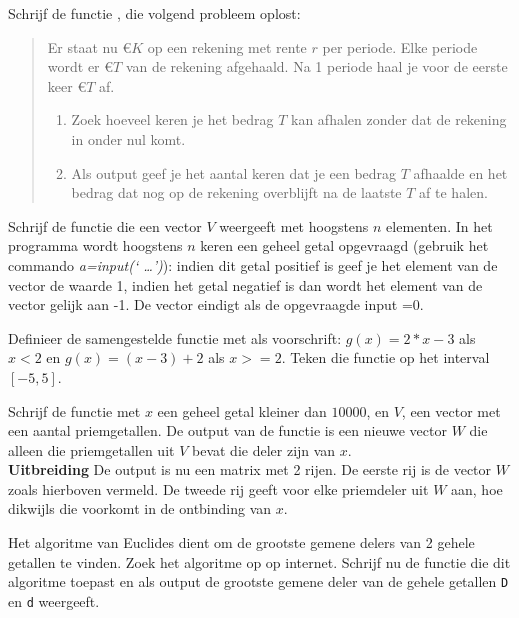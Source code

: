 \begin{oef}
Schrijf de functie , die volgend probleem oplost:
\begin{quote}
  Er staat nu \euro $K$  op een rekening met  rente $r$  per periode.
Elke periode wordt er \euro ${T}$ van de  rekening afgehaald. 
Na 1 periode haal je voor de eerste keer \euro ${T}$ af.
\begin{enumerate}
    \item Zoek hoeveel keren je het bedrag $T$ kan afhalen zonder dat de rekening in onder nul komt.
    \item Als output geef je het aantal keren dat je een bedrag 
          $T$ afhaalde en het bedrag dat nog op de rekening overblijft na 
          de laatste $T$ af te halen.
\end{enumerate}  
\end{quote}
\end{oef}

\begin{oef}
Schrijf de functie  die een vector $V$ 
weergeeft met hoogstens $n$ elementen. In het programma wordt hoogstens $n$ keren 
een geheel getal opgevraagd (gebruik het commando \emph{a=input(`  \ldots')}):
indien dit getal positief is geef je  het element van de vector de waarde 1, 
indien het getal negatief is dan wordt het element van de vector gelijk aan -1.
De vector eindigt als de opgevraagde input =0.
\end{oef}
\begin{oef}
Definieer de samengestelde functie  met
    als voorschrift:
$g(x)=2*x-3$ als $x<2$ en $g(x)=(x-3)+2$ als $x>=2$. 
Teken die functie op het
interval $[-5,5]$.
\end{oef}

\begin{oef}
    Schrijf de functie  met $x$ een 
    geheel getal kleiner dan  $10000$, en $V$, een vector met een 
    aantal priemgetallen. De output van de functie is een nieuwe 
    vector $W$ die alleen die priemgetallen uit $V$ bevat die deler 
    zijn van $x$.\\
    \textbf{Uitbreiding} De output is nu een matrix met 2 rijen. De 
    eerste rij is de vector $W$ zoals hierboven vermeld. De tweede 
    rij geeft voor elke priemdeler uit $W$ aan, hoe dikwijls die voorkomt in 
    de ontbinding van $x$.
    \end{oef}
\begin{oef}
Het algoritme van Euclides dient  om de grootste gemene delers van 2 gehele getallen
te vinden. Zoek het algoritme op op internet. Schrijf nu de functie 
 die dit algoritme toepast en als output de grootste gemene deler van de gehele getallen \verb+D+ en \verb+d+ weergeeft.
\end{oef}

